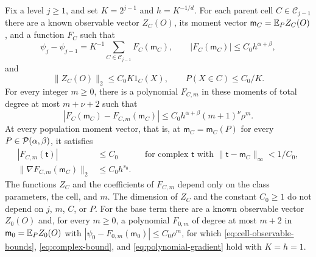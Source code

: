 \begin{lemma}
\label{lem:projection-polynomials}
Fix a level $j\ge1$, and set $K=2^{j-1}$ and $h=K^{-1/d}$. For each parent
cell $C\in\mathcal C_{j-1}$ there are a known observable vector $Z_C(O)$,
its moment vector $\mathsf m_C=\mathbb E_PZ_C(O)$, and a function $F_C$ such that
\[
 \psi_j-\psi_{j-1}=K^{-1}\sum_{C\in\mathcal C_{j-1}}F_C(\mathsf m_C),
 \qquad |F_C(\mathsf m_C)|\le C_0h^{\alpha+\beta},
\]
and
\begin{equation}\label{eq:cell-observable-bounds}
 \|Z_C(O)\|_2\le C_0K1_C(X),\qquad P(X\in C)\le C_0/K.
\end{equation}
For every integer $m\ge0$, there is a polynomial $F_{C,m}$ in these
moments of total degree at most $m+\nu+2$ such that
\begin{equation}\label{eq:increment-approximation}
 |F_C(\mathsf m_C)-F_{C,m}(\mathsf m_C)|
 \le C_0h^{\alpha+\beta}(m+1)^\nu\rho^m.
\end{equation}
At every population moment vector, that is, at $\mathsf m_C=\mathsf m_C(P)$
for every $P\in\mathcal P(\alpha,\beta)$, it satisfies
\begin{align}
 |F_{C,m}(\mathsf t)|&\le C_0
   &&\text{for complex }\mathsf t\text{ with }
     \|\mathsf t-\mathsf m_C\|_\infty<1/C_0,\label{eq:complex-bound}\\
 \|\nabla F_{C,m}(\mathsf m_C)\|_2&\le C_0h^{s_0}.
       &&\label{eq:polynomial-gradient}
\end{align}
The functions $Z_C$ and the coefficients of $F_{C,m}$ depend only on the
class parameters, the cell, and $m$. The dimension of $Z_C$ and the
constant $C_0\ge1$ do not depend on $j$, $m$, $C$, or $P$. For the base
term there are a known observable vector $Z_0(O)$ and, for every $m\ge0$,
a polynomial $F_{0,m}$ of degree at most $m+2$ in $\mathsf m_0=\mathbb E_PZ_0(O)$
with $|\psi_0-F_{0,m}(\mathsf m_0)|\le C_0\rho^m$, for which
\eqref{eq:cell-observable-bounds}, \eqref{eq:complex-bound}, and
\eqref{eq:polynomial-gradient} hold with $K=h=1$.
\end{lemma}

